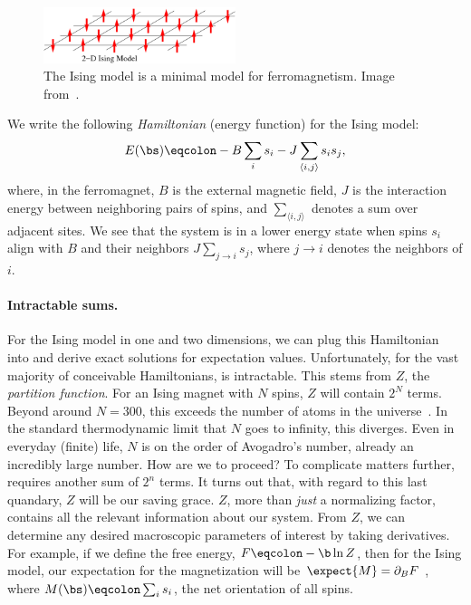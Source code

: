 \begin{figure}[ht]
  \centering \includegraphics[width=0.5\textwidth]{figures/ising.png}
  \caption{The Ising model is a minimal model for
    ferromagnetism. Image from~\cite{ising}.\label{fig:ising} }
\end{figure}

We write the following \textit{Hamiltonian} (energy function) for the
Ising model:%
\begin{equation}
  E(\bs)\eqcolon -B \sum_i s_i-J \sum_{\langle i,j\rangle} s_i s_j,
  \label{eq:ising-energy}
\end{equation}%
where, in the ferromagnet, $B$ is the external magnetic field, $J$ is
the interaction energy between neighboring pairs of spins, and
$\sum_{\langle i, j \rangle}$ denotes a sum over adjacent sites. We
see that the system is in a lower energy state when spins $s_i$ align
with $B$ and their neighbors $J\sum_{j \rightarrow i} s_j$, where
$j\rightarrow i$ denotes the neighbors of $i$.

\paragraph{Intractable sums. } For the Ising model in one and two
dimensions, we can plug this Hamiltonian into
 and derive exact solutions for
expectation values.  Unfortunately, for the vast majority of
conceivable Hamiltonians,  is
intractable. This stems from $Z$, the \textit{partition function}.
For an Ising magnet with $N$ spins, $Z$ will contain $2^N$
terms. Beyond around $N=300$, this exceeds the number of atoms in the
universe~\cite{guth-n-atoms}. In the standard thermodynamic limit that
$N$ goes to infinity, this diverges. Even in everyday (finite) life,
$N$ is on the order of Avogadro's number, already an incredibly large
number. How are we to proceed? To complicate matters further,
 requires another sum of $2^n$
terms. It turns out that, with regard to this last quandary, $Z$ will
be our saving grace. $Z$, more than \textit{just} a normalizing
factor, contains all the relevant information about our system. From
$Z$, we can determine any desired macroscopic parameters of interest
by taking derivatives. For example, if we define the free energy,
$F\eqcolon-\b \ln Z$, then for the Ising model, our
expectation for the magnetization will be $\expect{M}= \partial_B F$
, where $M(\bs)\eqcolon\sum_{i} s_i$, the net
orientation of all spins.

